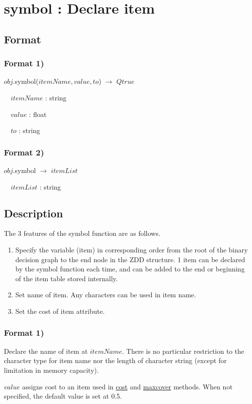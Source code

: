 
\section{symbol : Declare item\label{sect:symbol}}
\subsection*{Format}

\subsubsection{Format 1)}
$obj$.symbol($itemName,value,to$) $\rightarrow$ $Qtrue$

~~$itemName$ : string

~~$value$ : float

~~$to$ : string

\subsubsection{Format 2)}
$obj$.symbol $\rightarrow$ $itemList$

~~$itemList$ : string

\subsection*{Description}
The 3 features of the symbol function are as follows. 
\begin{enumerate}
\item Specify the variable (item) in corresponding order from the root of the binary decision graph to the end node in the ZDD structure. 
1 item can be declared by the symbol function each time, and can be added to the end or  beginning of the item table stored internally.
\item Set name of item. Any characters can be used in item name. 
\item Set the cost of item attribute. 
\end{enumerate}

\subsubsection{Format 1)}

Declare the name of item at $itemName$. 
There is no particular restriction to the character type for item name nor the length of character string (except for limitation in memory capacity). 

$value$ assigns cost to an item used in \hyperref[sect:cost]{cost} and \hyperref[sect:maxcover]{maxcover}  methods. 
When not specified, the default value is set at 0.5. 


